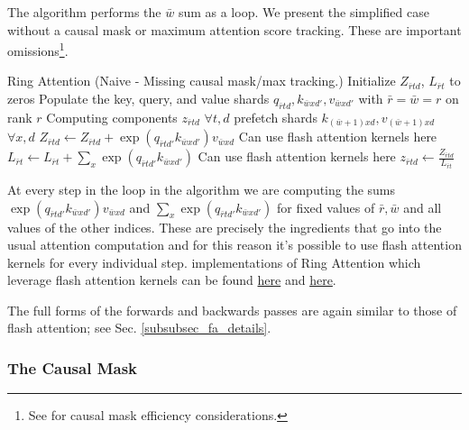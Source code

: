 \documentclass[11pt]{article}
\begin{document}
The algorithm performs the $ \bar{w}$ sum as a loop. We present the simplified case without a causal
mask or maximum attention score tracking. These are important omissions\footnote{See
\cite{brandon2023stripedattentionfasterring} for causal mask efficiency considerations.}.
\begin{algo}{Ring Attention (Naive - Missing causal mask/max tracking.)}
\State Initialize $ Z _{ \bar{r}td } $, $ L _{ \bar{r}t } $ to zeros
\State Populate the key, query, and value shards $ q _{ \bar{r}td },k _{ \bar{w}x d' },v _{ \bar{w}x d' } $ with $ \bar{r} =  \bar{w} = r $ on rank $ r $
 \Comment Computing components $ z _{ \bar{r}td } $ $ \forall t, d $
     prefetch shards $ k _{ (\bar{w}+1)xd }, v _{ (\bar{w}+1)xd } $ $ \forall x,d $
    \EndIf
    \State $ Z _{ \bar{r}td } \gets Z _{ \bar{r}td }+   \exp \left ( q _{ \bar{r}t d' } k _{ \bar{w}x d' } \right ) v _{ \bar{w}xd } $ \Comment Can use flash attention kernels here
    \State $ L _{ \bar{r}t } \gets  L _{ \bar{r}t } +  \sum _{ x } \exp \left ( q _{ \bar{r}t d' } k _{ \bar{w}x d' }\right )  $ \Comment Can use flash attention kernels here
\EndFor
\State $ z _{ \bar{r}td } \gets \frac{ Z _{ \bar{r}td } }{ L _{ \bar{r}t }  }$
\label{algo_ring_attn_fwd_naive}
\end{algo}

At every step in the loop in the algorithm we are computing the sums $ \exp \left ( q _{ \bar{r}t d'
} k _{ \bar{w}x d' } \right ) v _{ \bar{w}xd } $ and $ \sum _{ x } \exp \left ( q _{ \bar{r}t d' } k
_{ \bar{w}x d' } \right)  $ for fixed values of $ \bar{r}, \bar{w} $ and all values of the other
indices. These are precisely the ingredients that go into the usual attention computation and for
this reason it's possible to use flash attention kernels for every individual step. 
implementations of Ring Attention which leverage flash attention kernels can be found
\href{https://github.com/lucidrains/ring-attention-pytorch}{here} and
\href{https://github.com/zhuzilin/ring-flash-attention}{here}.

The full forms of the forwards and backwards passes are again similar to those of flash attention; see Sec. \ref{subsubsec_fa_details}.

\subsubsection{The Causal Mask}
\end{document}
